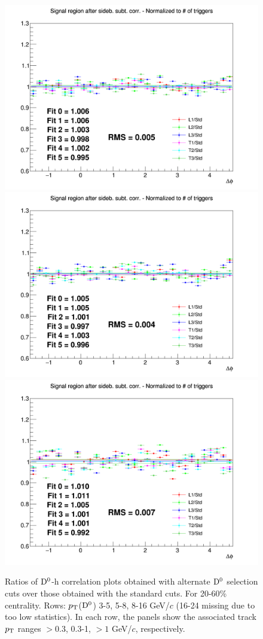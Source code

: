 \begin{figure}
{\includegraphics[width=0.31\linewidth]{figuresVsCent/Dzero/SystDcuts/20_60/Ratio_AzimCorrDistr_Dzero_Canvas_PtIntBins9to11_PoolInt_thr03to99.png}}
{\includegraphics[width=0.31\linewidth]{figuresVsCent/Dzero/SystDcuts/20_60/Ratio_AzimCorrDistr_Dzero_Canvas_PtIntBins9to11_PoolInt_thr03to1.png}}
{\includegraphics[width=0.31\linewidth]{figuresVsCent/Dzero/SystDcuts/20_60/Ratio_AzimCorrDistr_Dzero_Canvas_PtIntBins9to11_PoolInt_thr1to99.png}} \\
 \caption{Ratios of ${\rm D^0}$-h correlation plots obtained with alternate ${\rm D^0}$ selection cuts over those obtained with the standard cuts. For 20-60\% centrality. Rows: $p_{\rm T}$(${\rm D^0}$) 3-5, 5-8, 8-16 GeV/$c$ (16-24 missing due to too low statistics). In each row, the panels show the associated track
$p_{\rm T}$ ranges $> 0.3$, 0.3-1, $> 1$ GeV/$c$, respectively.}
\label{fig:SysDcut2060}
\end{figure}

